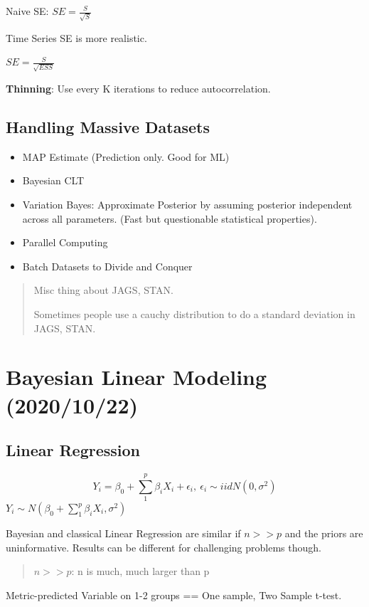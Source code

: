 \documentclass[11pt]{article}
\begin{document}
Naive SE: \(SE = \frac{S}{\sqrt{S}}\)

Time Series SE is more realistic.

\(SE = \frac{S}{\sqrt {ESS}}\)

\textbf{Thinning}: Use every K iterations to reduce autocorrelation.

\subsection{Handling Massive Datasets}
\label{sec:org5ae5975}
\begin{itemize}
\item MAP Estimate (Prediction only. Good for ML)
\item Bayesian CLT
\item Variation Bayes: Approximate Posterior by assuming posterior independent
across all parameters. (Fast but questionable statistical properties).
\item Parallel Computing
\item Batch Datasets to Divide and Conquer
\end{itemize}


\begin{quote}
Misc thing about JAGS, STAN.

Sometimes people use a cauchy distribution to do a standard deviation in JAGS, STAN.
\end{quote}
\section{Bayesian Linear Modeling (2020/10/22)}
\label{sec:orge1b2d00}

\subsection{Linear Regression}
\label{sec:orgf2c302a}

$$
Y_i = \beta_0 + \sum_{1}^{p} \beta_i X_i + \epsilon_i, \ \epsilon_i \sim iid
N(0, \sigma^2)
$$
\(Y_i \sim N(\beta_0 + \sum_{1}^{p} \beta_i X_i, \sigma^2)\)

Bayesian and classical Linear Regression are similar if \(n >> p\) and the priors
are uninformative. Results can be different for challenging problems though.

\begin{quote}
\(n >> p\): n is much, much larger than p
\end{quote}

Metric-predicted Variable on 1-2 groups == One sample, Two Sample t-test.
\end{document}
